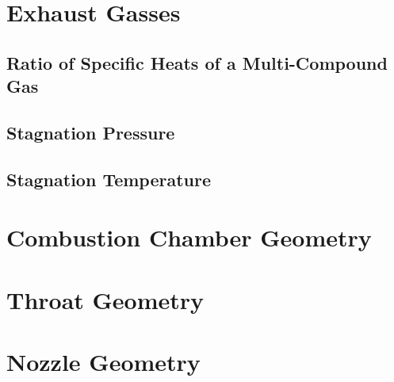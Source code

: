 \documentclass{article}
\begin{document}
\pagebreak
\section{Exhaust Gasses}

\subsection{Ratio of Specific Heats of a Multi-Compound Gas}



\subsection{Stagnation Pressure}



\subsection{Stagnation Temperature}


\pagebreak
\section{Combustion Chamber Geometry}

\pagebreak
\section{Throat Geometry}

\pagebreak
\section{Nozzle Geometry}
\end{document}
